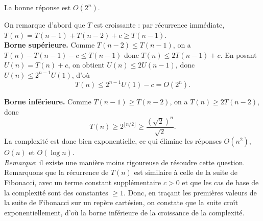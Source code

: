 \begin{Exercice} [5 minutes]
    \begin{solution}
    La bonne réponse est $O(2^n)$.

    On remarque d'abord que $T$ est croissante : par récurrence immédiate, $T(n) = T(n-1) + T(n-2) + c \ge T(n-1)$.\\

    \textbf{Borne supérieure.} Comme $T(n-2) \le T(n-1)$, on a $T(n) - T(n-1) - c \le T(n-1)$ donc  $T(n) \le 2T(n-1) + c$. En posant $U(n) = T(n) + c$, on obtient $U(n) \le 2U(n-1)$, donc $U(n) \le 2^{n-1}U(1)$, d'où
    \[
        T(n) \le 2^{n-1}U(1) - c = O(2^n).
    \]

    \textbf{Borne inférieure.} Comme $T(n-1) \ge T(n-2)$, on a $T(n) \ge 2T(n-2)$, donc
    \[
        T(n) \ge 2^{\lfloor n/2 \rfloor} \ge \frac{(\sqrt{2})^n}{\sqrt{2}}.
    \]
    La complexité est donc bien exponentielle, ce qui élimine les réponses $O(n^2)$, $O(n)$ et $O(\log n)$. \\

    \emph{Remarque}: il existe une manière moins rigoureuse de résoudre cette question. Remarquons que la récurrence de \(T(n)\) est similaire à celle de la suite de Fibonacci, avec un terme constant supplémentaire $c>0$ et que les cas de base de la complexité sont des constantes $\geq 1$. Donc, en traçant les premières valeurs de la suite de Fibonacci sur un repère cartésien, on constate que la suite croît exponentiellement, d'où la borne inférieure de la croissance de la complexité. 

\end{solution}
\end{Exercice}

